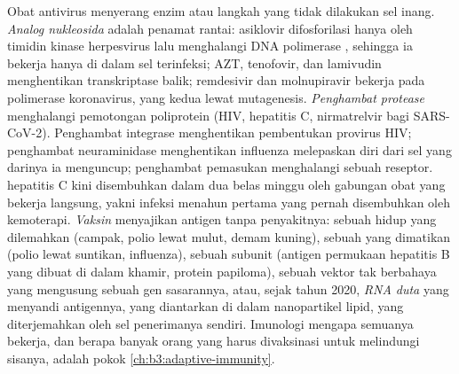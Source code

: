 \begin{definition}\label{def:b3:virology:drugs}
%
Obat antivirus menyerang enzim  atau langkah yang tidak dilakukan sel
inang. \emph{Analog nukleosida} adalah penamat rantai: asiklovir
difosforilasi hanya oleh timidin kinase herpesvirus lalu menghalangi DNA
polimerase , sehingga ia bekerja hanya di dalam sel terinfeksi;
AZT, tenofovir, dan lamivudin menghentikan transkriptase balik; remdesivir dan
molnupiravir bekerja pada polimerase koronavirus, yang kedua lewat
mutagenesis. \emph{Penghambat protease} menghalangi pemotongan poliprotein
 (HIV, hepatitis C, nirmatrelvir bagi SARS-CoV-2). Penghambat integrase
menghentikan pembentukan provirus HIV; penghambat neuraminidase menghentikan
 influenza melepaskan diri dari sel yang darinya ia menguncup; penghambat
pemasukan menghalangi sebuah reseptor.  hepatitis C kini disembuhkan dalam
dua belas minggu oleh gabungan obat yang bekerja langsung, yakni infeksi 
menahun pertama yang pernah disembuhkan oleh kemoterapi. \emph{Vaksin}
menyajikan antigen  tanpa penyakitnya: sebuah  hidup yang dilemahkan
(campak, polio lewat mulut, demam kuning), sebuah  yang dimatikan (polio
lewat suntikan, influenza), sebuah subunit (antigen permukaan hepatitis B yang
dibuat di dalam khamir, protein   papiloma), sebuah vektor  tak
berbahaya yang mengusung sebuah gen sasarannya, atau, sejak tahun 2020,
\emph{RNA duta} yang menyandi antigennya, yang diantarkan di dalam nanopartikel
lipid, yang diterjemahkan oleh sel penerimanya sendiri. Imunologi mengapa
semuanya bekerja, dan berapa banyak orang yang harus divaksinasi untuk
melindungi sisanya, adalah pokok \cref{ch:b3:adaptive-immunity}.
\end{definition}

